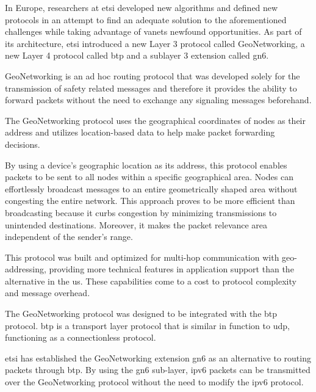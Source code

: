 In Europe, researchers at \gls{etsi} developed new algorithms and defined new protocols in an attempt to find an adequate solution to the aforementioned challenges while taking advantage of \glspl{vanet} newfound opportunities. As part of its architecture, \gls{etsi} introduced a new Layer 3 protocol called GeoNetworking\cite{etsi_intelligent_2014-1}\cite{etsi_intelligent_2013-1}\cite{etsi_intelligent_2014}\cite{etsi_intelligent_2020-1}\cite{etsi_intelligent_2019}\cite{etsi_intelligent_2014-2}, a new Layer 4 protocol called \gls{btp}\cite{etsi_intelligent_2019} and a sublayer 3 extension called \gls{gn6}\cite{etsi_intelligent_2014-2}.

GeoNetworking is an ad hoc routing protocol that was developed solely for the transmission of safety related messages and therefore it provides the ability to forward packets without the need to exchange any signaling messages beforehand.

The GeoNetworking protocol uses the geographical coordinates of nodes as their address and utilizes location-based data to help make packet forwarding decisions. 

By using a device's geographic location as its address, this protocol enables packets to be sent to all nodes within a specific geographical area. Nodes can effortlessly broadcast messages to an entire geometrically shaped area without congesting the entire network. This approach proves to be more efficient than broadcasting because it curbs congestion by minimizing transmissions to unintended destinations. Moreover, it makes the packet relevance area independent of the sender's range.

This protocol was built and optimized for multi-hop communication with geo-addressing, providing more technical features in application support than the alternative in the \gls{us}. These capabilities come to a cost to protocol complexity and message overhead\cite{festag_standards_2015}.

The GeoNetworking protocol was designed to be integrated with the \gls{btp} protocol. \gls{btp} is a transport layer protocol that is similar in function to \gls{udp}, functioning as a connectionless protocol\cite{festag_cooperative_2014}.

\gls{etsi} has established the GeoNetworking extension \gls{gn6} as an alternative to routing packets through \gls{btp}. By using the \gls{gn6} sub-layer, \gls{ipv6} packets can be transmitted over the GeoNetworking protocol without the need to modify the \gls{ipv6} protocol\cite{festag_cooperative_2014}.



